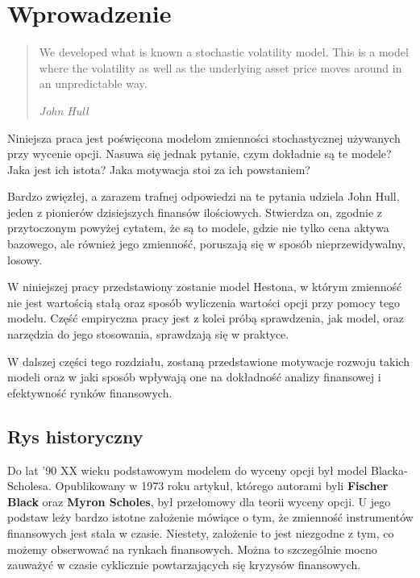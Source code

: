 \documentclass{pracamgr}
\begin{document}
\tableofcontents


\chapter{Wprowadzenie}
\label{chap:introduction}
\begin{quote}

  We developed what is known a stochastic volatility model. 
  This is a model where the volatility as well as the 
  underlying asset price moves around in an unpredictable way.

\raggedleft\slshape John Hull 
\end{quote}
Niniejsza praca jest poświęcona modelom zmienności stochastycznej używanych przy wycenie opcji. 
Nasuwa się jednak pytanie, czym dokładnie są te modele? 
Jaka jest ich istota? Jaka motywacja stoi za ich powstaniem?


Bardzo zwięzłej, a zarazem trafnej odpowiedzi na te pytania udziela John Hull, 
jeden z pionierów dzisiejszych finansów ilościowych. Stwierdza on, zgodnie z przytoczonym 
powyżej cytatem, że są to modele, gdzie nie tylko cena aktywa bazowego, ale również jego zmienność, 
poruszają się w sposób nieprzewidywalny, losowy. 

W niniejszej pracy przedstawiony zostanie model Hestona, w którym zmienność nie jest wartością stałą 
oraz sposób wyliczenia wartości opcji przy pomocy tego modelu.
Część empiryczna pracy jest z kolei próbą sprawdzenia, jak model, oraz narzędzia do jego stosowania, sprawdzają się w praktyce.

W dalszej części tego rozdziału, zostaną przedstawione motywacje rozwoju takich modeli oraz w jaki sposób
wpływają one na dokładność analizy finansowej i efektywność rynków finansowych. 


\section{Rys historyczny} %
\label{sec:rys_historyczny}

Do lat '90 XX wieku podstawowym modelem do wyceny opcji był model Blacka-Scholesa. Opublikowany w 1973 \cite{BlackScholes} roku artykuł, którego autorami byli \textbf{Fischer Black} oraz \textbf{Myron Scholes}, był przełomowy dla teorii wyceny opcji.
U jego podstaw leży bardzo istotne założenie mówiące o tym, że zmienność instrumentów finansowych jest stała w czasie. 
Niestety, założenie to jest niezgodne z tym, co możemy obserwować na rynkach finansowych. 
Można to szczególnie mocno zauważyć w czasie cyklicznie powtarzających się kryzysów finansowych.
\end{document}
